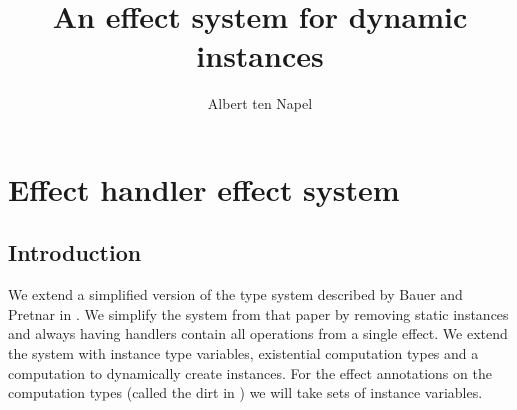 \documentclass[12pt]{article}
\title{An effect system for dynamic instances}
\author{Albert ten Napel}
\date{}
\begin{document}
\maketitle

\section{Effect handler effect system}

\subsection{Introduction}
We extend a simplified version of the type system described by Bauer and Pretnar in \cite{effectsystem}.
We simplify the system from that paper by removing static instances and always having handlers contain all operations from a single effect.
We extend the system with instance type variables,  existential computation types and a computation to dynamically create instances.
For the effect annotations on the computation types (called the dirt in \cite{effectsystem}) we will take sets of instance variables. 

\newpage
\end{document}
